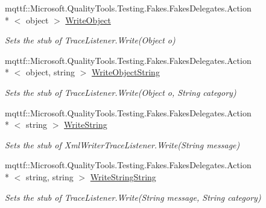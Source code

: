\begin{DoxyCompactItemize}
mqttf\-::\-Microsoft.\-Quality\-Tools.\-Testing.\-Fakes.\-Fakes\-Delegates.\-Action\\*
$<$ object $>$ \hyperlink{class_system_1_1_diagnostics_1_1_fakes_1_1_stub_xml_writer_trace_listener_a59e4d4eaf4f872179b8f1eacc5cffc68}{Write\-Object}
\begin{DoxyCompactList}\small\item\em Sets the stub of Trace\-Listener.\-Write(\-Object o)\end{DoxyCompactList}\item 
mqttf\-::\-Microsoft.\-Quality\-Tools.\-Testing.\-Fakes.\-Fakes\-Delegates.\-Action\\*
$<$ object, string $>$ \hyperlink{class_system_1_1_diagnostics_1_1_fakes_1_1_stub_xml_writer_trace_listener_aef17d4915c09f8b9f851f15f70b5b960}{Write\-Object\-String}
\begin{DoxyCompactList}\small\item\em Sets the stub of Trace\-Listener.\-Write(\-Object o, String category)\end{DoxyCompactList}\item 
mqttf\-::\-Microsoft.\-Quality\-Tools.\-Testing.\-Fakes.\-Fakes\-Delegates.\-Action\\*
$<$ string $>$ \hyperlink{class_system_1_1_diagnostics_1_1_fakes_1_1_stub_xml_writer_trace_listener_a538f1248186f4afc78944d3dfe1f847d}{Write\-String}
\begin{DoxyCompactList}\small\item\em Sets the stub of Xml\-Writer\-Trace\-Listener.\-Write(\-String message)\end{DoxyCompactList}\item 
mqttf\-::\-Microsoft.\-Quality\-Tools.\-Testing.\-Fakes.\-Fakes\-Delegates.\-Action\\*
$<$ string, string $>$ \hyperlink{class_system_1_1_diagnostics_1_1_fakes_1_1_stub_xml_writer_trace_listener_ad3c874c0cbce16d41a49e12ad49f72a7}{Write\-String\-String}
\begin{DoxyCompactList}\small\item\em Sets the stub of Trace\-Listener.\-Write(\-String message, String category)\end{DoxyCompactList}\end{DoxyCompactItemize}
